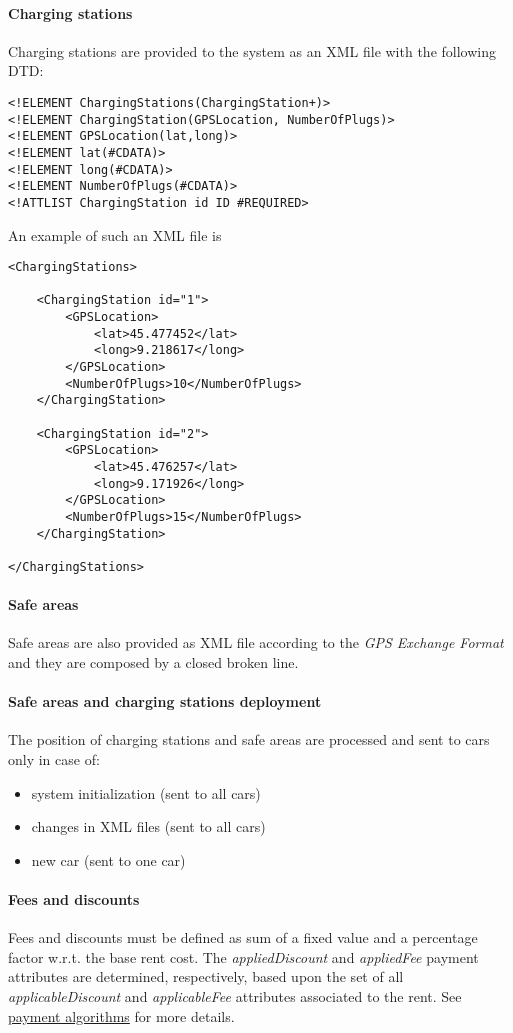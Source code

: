 \paragraph{Charging stations}Charging stations are provided to the system as an XML file with the following DTD:
\lstset{language=XML,frame=false}
\begin{lstlisting}
<!ELEMENT ChargingStations(ChargingStation+)>
<!ELEMENT ChargingStation(GPSLocation, NumberOfPlugs)>
<!ELEMENT GPSLocation(lat,long)>
<!ELEMENT lat(#CDATA)>
<!ELEMENT long(#CDATA)>
<!ELEMENT NumberOfPlugs(#CDATA)>
<!ATTLIST ChargingStation id ID #REQUIRED>
\end{lstlisting}
An example of such an XML file is 
\begin{lstlisting}
<ChargingStations>

	<ChargingStation id="1">
		<GPSLocation>
			<lat>45.477452</lat>
			<long>9.218617</long>
		</GPSLocation>
		<NumberOfPlugs>10</NumberOfPlugs>
	</ChargingStation>
	
	<ChargingStation id="2">
		<GPSLocation>
			<lat>45.476257</lat>
			<long>9.171926</long>
		</GPSLocation>
		<NumberOfPlugs>15</NumberOfPlugs>
	</ChargingStation>
	
</ChargingStations>
\end{lstlisting}

\paragraph{Safe areas}Safe areas are also provided as XML file according to the \emph{GPS Exchange Format} and they are composed by a closed broken line.

\paragraph{Safe areas and charging stations deployment}The position of charging stations and safe areas are processed and sent to cars only in case of:
\begin{itemize}
	\item system initialization (sent to all cars)
	\item changes in XML files (sent to all cars)
	\item new car (sent to one car)
\end{itemize}

\paragraph{Fees and discounts}
Fees and discounts must be defined as sum of a fixed value and a percentage factor w.r.t. the base rent cost.
The \emph{appliedDiscount} and \emph{appliedFee} payment attributes are determined, respectively, based upon the set of all \emph{applicableDiscount} and \emph{applicableFee} attributes associated to the rent. See \hyperref[sec:paymentAlgorithms]{payment algorithms} for more details.


